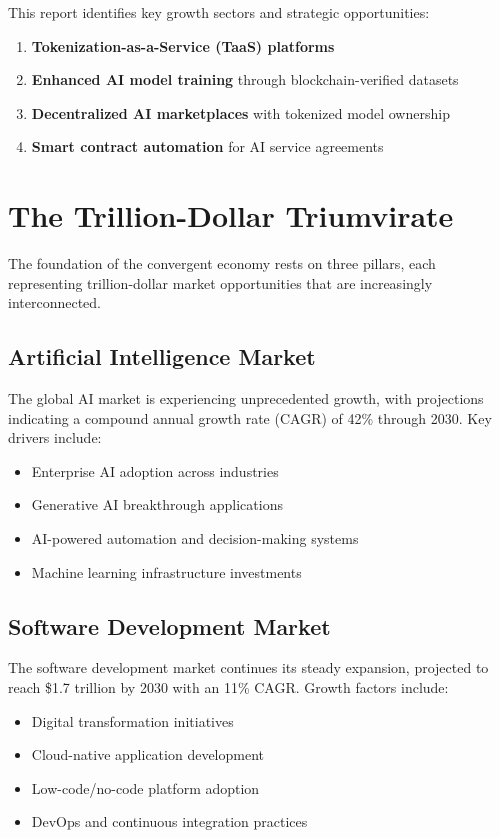\documentclass[11pt,a4paper]{report}
\begin{document}
This report identifies key growth sectors and strategic opportunities:

\begin{enumerate}
\item \textbf{Tokenization-as-a-Service (TaaS) platforms}
\item \textbf{Enhanced AI model training} through blockchain-verified datasets
\item \textbf{Decentralized AI marketplaces} with tokenized model ownership
\item \textbf{Smart contract automation} for AI service agreements
\end{enumerate}

\chapter{The Trillion-Dollar Triumvirate}

The foundation of the convergent economy rests on three pillars, each representing trillion-dollar market opportunities that are increasingly interconnected.

\section{Artificial Intelligence Market}

The global AI market is experiencing unprecedented growth, with projections indicating a compound annual growth rate (CAGR) of 42\% through 2030. Key drivers include:

\begin{itemize}
\item Enterprise AI adoption across industries
\item Generative AI breakthrough applications
\item AI-powered automation and decision-making systems
\item Machine learning infrastructure investments
\end{itemize}

\section{Software Development Market}

The software development market continues its steady expansion, projected to reach \$1.7 trillion by 2030 with an 11\% CAGR. Growth factors include:

\begin{itemize}
\item Digital transformation initiatives
\item Cloud-native application development
\item Low-code/no-code platform adoption
\item DevOps and continuous integration practices
\end{itemize}
\end{document}
